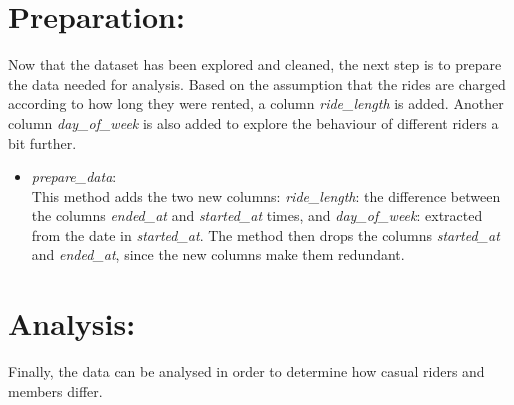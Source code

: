 \documentclass[12pt]{article}
\begin{document}
\section*{Preparation:}
Now that the dataset has been explored and cleaned, the next step is to prepare the data needed for analysis. Based on the assumption that the rides are charged according to how long they were rented, a column \textit{ride\_length} is added. Another column \textit{day\_of\_week} is also added to explore the behaviour of different riders a bit further. 

\begin{itemize}
	\item \textit{prepare\_data}:\\
	This method adds the two new columns: \textit{ride\_length}: the difference between the columns \textit{ended\_at} and \textit{started\_at} times, and \textit{day\_of\_week}: extracted from the date in \textit{started\_at}. The method then drops the columns \textit{started\_at} and \textit{ended\_at}, since the new columns make them redundant.
	
\end{itemize}

\section*{Analysis:}
Finally, the data can be analysed in order to determine how casual riders and members differ.
\end{document}
